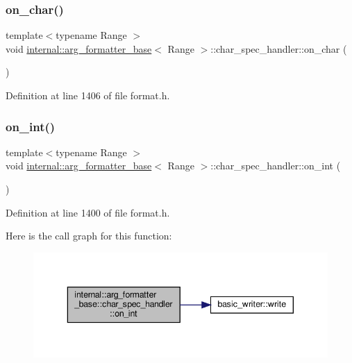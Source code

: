 \subsubsection{\texorpdfstring{on\+\_\+char()}{on\_char()}}
{\footnotesize\ttfamily template$<$typename Range $>$ \\
void \hyperlink{classinternal_1_1arg__formatter__base}{internal\+::arg\+\_\+formatter\+\_\+base}$<$ Range $>$\+::char\+\_\+spec\+\_\+handler\+::on\+\_\+char (\begin{DoxyParamCaption}{ }\end{DoxyParamCaption})\hspace{0.3cm}{\ttfamily [inline]}}



Definition at line 1406 of file format.\+h.

\mbox{\label{structinternal_1_1arg__formatter__base_1_1char__spec__handler_a97c9496a1f9dd832fdcd383fe075804a}} 
\subsubsection{\texorpdfstring{on\+\_\+int()}{on\_int()}}
{\footnotesize\ttfamily template$<$typename Range $>$ \\
void \hyperlink{classinternal_1_1arg__formatter__base}{internal\+::arg\+\_\+formatter\+\_\+base}$<$ Range $>$\+::char\+\_\+spec\+\_\+handler\+::on\+\_\+int (\begin{DoxyParamCaption}{ }\end{DoxyParamCaption})\hspace{0.3cm}{\ttfamily [inline]}}



Definition at line 1400 of file format.\+h.

Here is the call graph for this function\+:
\nopagebreak
\begin{figure}[H]
\begin{center}
\leavevmode
\includegraphics[width=343pt]{structinternal_1_1arg__formatter__base_1_1char__spec__handler_a97c9496a1f9dd832fdcd383fe075804a_cgraph}
\end{center}
\end{figure}


